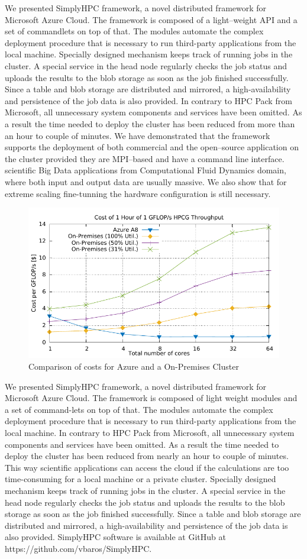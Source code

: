 \documentclass[3p,times]{elsarticle}
\begin{document}
We presented SimplyHPC framework, a novel distributed framework for Microsoft Azure Cloud. The framework is composed of a light--weight API and a set of commandlets on top of that. The modules automate the complex deployment procedure that is necessary to run third-party applications from the local machine. Specially designed mechanism keeps track of running jobs in the cluster. A special service in the head node regularly checks the job status and uploads the results to the blob storage as soon as the job finished successfully. Since a table and blob storage are distributed and mirrored, a high-availability and persistence of the job data is also provided. In contrary to HPC Pack from Microsoft, all unnecessary system components and services have been omitted. As a result the time needed to deploy the cluster has been reduced from more than an hour to couple of minutes.  We have demonstrated that the framework supports the deployment of both commercial and the open--source application on the cluster provided they are MPI--based and have a command line interface. scientific Big Data applications from Computational Fluid Dynamics domain, where both input and output data are usually massive. We also show that for extreme scaling  fine-tunning the hardware configuration is still necessary.
\begin{figure}
	\centering
	\includegraphics[width=.5\linewidth]{gplt-cost}
	\caption{Comparison of costs for Azure and a On-Premises Cluster}
	\label{fig:costs}
\end{figure}

We presented SimplyHPC framework, a novel distributed framework for Microsoft Azure Cloud. The framework is composed of light weight modules and a set of command-lets on top of that. The modules automate the complex deployment procedure that is necessary to run third-party applications from the local machine. In contrary to HPC Pack from Microsoft, all unnecessary system components and services have been omitted. As a result the time needed to deploy the cluster has been reduced from nearly an hour to couple of minutes.  This way scientific applications can access the cloud if the calculations are too time-consuming for a local machine or a private cluster. Specially designed mechanism keeps track of running jobs in the cluster. A special service in the head node regularly checks the job status and uploads the results to the blob storage as soon as the job finished successfully. Since a table and blob storage are distributed and mirrored, a high-availability and persistence of the job data is also provided. SimplyHPC software is available at GitHub at https://github.com/vbaros/SimplyHPC.
\end{document}
